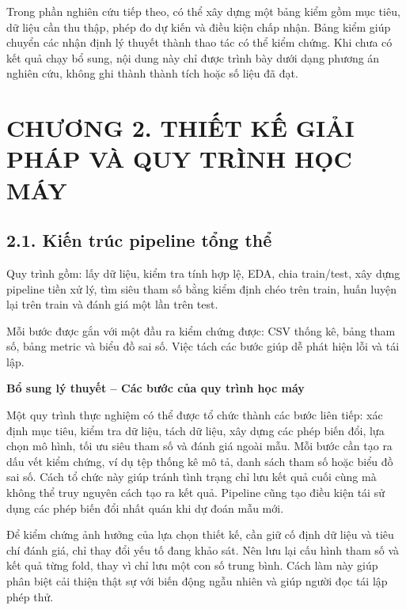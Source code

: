 \documentclass[12pt,a4paper,oneside]{article}
\begin{document}
Trong phần nghiên cứu tiếp theo, có thể xây dựng một bảng kiểm gồm mục tiêu, dữ liệu cần thu thập, phép đo dự kiến và điều kiện chấp nhận. Bảng kiểm giúp chuyển các nhận định lý thuyết thành thao tác có thể kiểm chứng. Khi chưa có kết quả chạy bổ sung, nội dung này chỉ được trình bày dưới dạng phương án nghiên cứu, không ghi thành thành tích hoặc số liệu đã đạt.\par

\clearpage
\section*{CHƯƠNG 2. THIẾT KẾ GIẢI PHÁP VÀ QUY TRÌNH HỌC MÁY}

\subsection*{2.1. Kiến trúc pipeline tổng thể}

Quy trình gồm: lấy dữ liệu, kiểm tra tính hợp lệ, EDA, chia train/test,
xây dựng pipeline tiền xử lý, tìm siêu tham số bằng kiểm định chéo trên
train, huấn luyện lại trên train và đánh giá một lần trên test.

Mỗi bước được gắn với một đầu ra kiểm chứng được: CSV thống kê, bảng
tham số, bảng metric và biểu đồ sai số. Việc tách các bước giúp dễ phát
hiện lỗi và tái lập.


\par\noindent\textbf{Bổ sung lý thuyết -- Các bước của quy trình học máy}\par
Một quy trình thực nghiệm có thể được tổ chức thành các bước liên tiếp: xác định mục tiêu, kiểm tra dữ liệu, tách dữ liệu, xây dựng các phép biến đổi, lựa chọn mô hình, tối ưu siêu tham số và đánh giá ngoài mẫu. Mỗi bước cần tạo ra dấu vết kiểm chứng, ví dụ tệp thống kê mô tả, danh sách tham số hoặc biểu đồ sai số. Cách tổ chức này giúp tránh tình trạng chỉ lưu kết quả cuối cùng mà không thể truy nguyên cách tạo ra kết quả. Pipeline cũng tạo điều kiện tái sử dụng các phép biến đổi nhất quán khi dự đoán mẫu mới.\par

Để kiểm chứng ảnh hưởng của lựa chọn thiết kế, cần giữ cố định dữ liệu và tiêu chí đánh giá, chỉ thay đổi yếu tố đang khảo sát. Nên lưu lại cấu hình tham số và kết quả từng fold, thay vì chỉ lưu một con số trung bình. Cách làm này giúp phân biệt cải thiện thật sự với biến động ngẫu nhiên và giúp người đọc tái lập phép thử.\par
\end{document}

